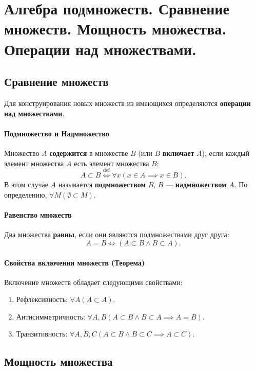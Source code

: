 \section{Алгебра подмножеств. Сравнение множеств. Мощность множества. Операции над множествами.}

\subsection*{Сравнение множеств}

Для конструирования новых множеств из имеющихся определяются \textbf{операции над множествами}.

\paragraph{Подмножество и Надмножество}
Множество $A$ \textbf{содержится} в множестве $B$ (или $B$ \textbf{включает} $A$), если каждый элемент множества $A$ есть элемент множества $B$:
$$A \subset B \stackrel{\text{def}}{\iff} \forall x (x \in A \implies x \in B).$$
В этом случае $A$ называется \textbf{подмножеством} $B$, $B$ --- \textbf{надмножеством} $A$.
По определению, $\forall M (\emptyset \subset M)$.

\paragraph{Равенство множеств}
Два множества \textbf{равны}, если они являются подмножествами друг друга:
$$A = B \iff (A \subset B \land B \subset A).$$

\paragraph{Свойства включения множеств (Теорема)}
Включение множеств обладает следующими свойствами:
\begin{enumerate}
    \item Рефлексивность: $\forall A (A \subset A)$.
    \item Антисимметричность: $\forall A, B (A \subset B \land B \subset A \implies A = B)$.
    \item Транзитивность: $\forall A, B, C (A \subset B \land B \subset C \implies A \subset C)$.
\end{enumerate}

\subsection*{Мощность множества}

